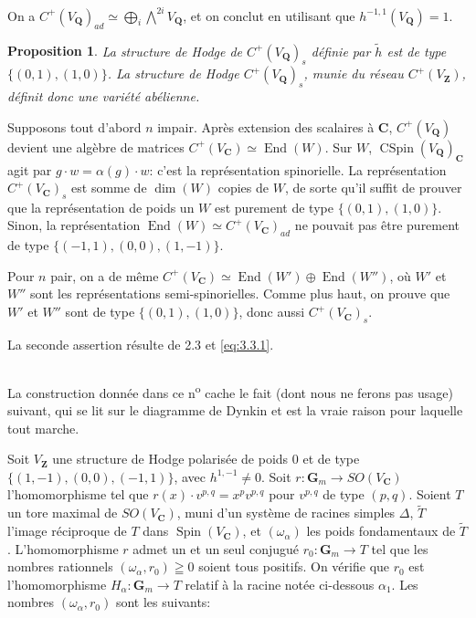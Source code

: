 \documentclass[11pt]{amsart}
\theoremstyle{plain}
\newtheorem{proposition}[theoreme]{Proposition}
\theoremstyle{definition}
\theoremstyle{remark}
\begin{document}
On a $C^+(V_\mathbf{Q})_{ad}\simeq\bigoplus_i\overset{2i}{\bigwedge}V_\mathbf{Q}$, et on conclut en utilisant que $h^{-1,1}(V_\mathbf{Q})=1$.

\begin{proposition}\label{prop:4.5}
La structure de Hodge de $C^+(V_\mathbf{Q})_s$ d\'efinie par $\tilde{h}$ est de type $\{(0,1),(1,0)\}$. La structure de Hodge $C^+(V_\mathbf{Q})_s$, munie du r\'eseau $C^+(V_\mathbf{Z})$, d\'efinit donc une vari\'et\'e ab\'elienne.
\end{proposition}

Supposons tout d'abord $n$ impair. Apr\`es extension des scalaires \`a $\mathbf{C}$, $C^+(V_\mathbf{Q})$ devient une alg\`ebre de matrices $C^+(V_\mathbf{C})\simeq\operatorname{End}(W)$. Sur $W$, $\operatorname{CSpin}(V_\mathbf{Q})_\mathbf{C}$ agit par $g\cdot w=\alpha(g)\cdot w$: c'est la repr\'esentation spinorielle. La repr\'esentation $C^+(V_\mathbf{C})_s$ est somme de $\dim(W)$ copies de $W$, de sorte qu'il suffit de prouver que la repr\'esentation de poids un $W$ est purement de type $\{(0,1),(1,0)\}$. Sinon, la repr\'esentation $\operatorname{End}(W)\simeq C^+(V_\mathbf{C})_{ad}$ ne pouvait pas \^etre purement de type $\{(-1,1),(0,0),(1,-1)\}$.

Pour $n$ pair, on a de m\^eme $C^+(V_\mathbf{C})\simeq\operatorname{End}(W')\oplus\operatorname{End}(W'')$, o\`u $W'$ et $W''$ sont les repr\'esentations semi-spinorielles. Comme plus haut, on prouve que $W'$ et $W''$ sont de type $\{(0,1),(1,0)\}$, donc aussi $C^+(V_\mathbf{C})_s$.

La seconde assertion r\'esulte de 2.3 et \eqref{eq:3.3.1}.

\subsection*{}
La construction donn\'ee dans ce n\textsuperscript{o} cache le fait (dont nous ne ferons pas usage) suivant, qui se lit sur le diagramme de Dynkin et est la vraie raison pour laquelle tout marche.

Soit $V_\mathbf{Z}$ une structure de Hodge polaris\'ee de poids $0$ et de type $\{(1,-1),(0,0),(-1,1)\}$, avec $h^{1,-1}\neq0$. Soit $r\colon\mathbf{G}_m\to SO(V_\mathbf{C})$ l'homomorphisme tel que $r(x)\cdot v^{p,q}=x^p v^{p,q}$ pour $v^{p,q}$ de type $(p,q)$. Soient $T$ un tore maximal de $SO(V_\mathbf{C})$, muni d'un syst\`eme de racines simples $\Delta$, $\tilde{T}$ l'image r\'eciproque de $T$ dans $\operatorname{Spin}(V_\mathbf{C})$, et $(\omega_\alpha)$ les poids fondamentaux de $\tilde{T}$. L'homomorphisme $r$ admet un et un seul conjugu\'e $r_0\colon\mathbf{G}_m\to T$ tel que les nombres rationnels $(\omega_\alpha,r_0)\geqq 0$ soient tous positifs. On v\'erifie que $r_0$ est l'homomorphisme $H_\alpha\colon\mathbf{G}_m\to T$ relatif \`a la racine not\'ee ci-dessous $\alpha_1$. Les nombres $(\omega_\alpha,r_0)$ sont les suivants:
\end{document}
